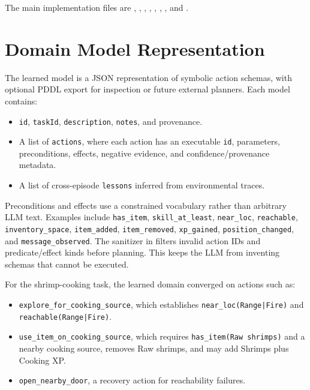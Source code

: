 \documentclass[10pt,twocolumn,letterpaper]{article}
\begin{document}
The main implementation files are , , , , , , , and .

\section{Domain Model Representation}

The learned model is a JSON representation of symbolic action schemas, with optional PDDL export for inspection or future external planners. Each model contains:

\begin{itemize}
    \item \texttt{id}, \texttt{taskId}, \texttt{description}, \texttt{notes}, and provenance.
    \item A list of \texttt{actions}, where each action has an executable \texttt{id}, parameters, preconditions, effects, negative evidence, and confidence/provenance metadata.
    \item A list of cross-episode \texttt{lessons} inferred from environmental traces.
\end{itemize}

Preconditions and effects use a constrained vocabulary rather than arbitrary LLM text. Examples include \texttt{has\_item}, \texttt{skill\_at\_least}, \texttt{near\_loc}, \texttt{reachable}, \texttt{inventory\_space}, \texttt{item\_added}, \texttt{item\_removed}, \texttt{xp\_gained}, \texttt{position\_changed}, and \texttt{message\_observed}. The sanitizer in  filters invalid action IDs and predicate/effect kinds before planning. This keeps the LLM from inventing schemas that cannot be executed.

For the shrimp-cooking task, the learned domain converged on actions such as:

\begin{itemize}
    \item \texttt{explore\_for\_cooking\_source}, which establishes \texttt{near\_loc(Range|Fire)} and \texttt{reachable(Range|Fire)}.
    \item \texttt{use\_item\_on\_cooking\_source}, which requires \texttt{has\_item(Raw shrimps)} and a nearby cooking source, removes Raw shrimps, and may add Shrimps plus Cooking XP.
    \item \texttt{open\_nearby\_door}, a recovery action for reachability failures.
\end{itemize}
\end{document}
